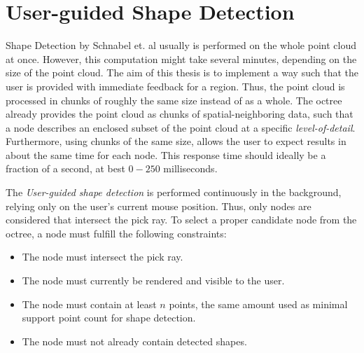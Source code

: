 \section{User-guided Shape Detection}
\label{sec:user_guided_sd}

Shape Detection by Schnabel et. al\cite{schnabel-2007-efficient} usually is performed on the whole point cloud at once. However, this computation might take several minutes, depending on the size of the point cloud. The aim of this thesis is to implement a way such that the user is provided with immediate feedback for a region. Thus, the point cloud is processed in chunks of roughly the same size instead of as a whole. The octree already provides the point cloud as chunks of spatial-neighboring data, such that a node describes an enclosed subset of the point cloud at a specific \textit{level-of-detail}. Furthermore, using chunks of the same size, allows the user to expect results in about the same time for each node. This response time should ideally be a fraction of a second, at best $0-250$ milliseconds. 

The \textit{User-guided shape detection} is performed continuously in the background, relying only on the user's current mouse position. Thus, only nodes are considered that intersect the pick ray. To select a proper candidate node from the octree, a node must fulfill the following constraints: 
\begin{itemize}
	\item The node must intersect the pick ray.
	\item The node must currently be rendered and visible to the user. 
	\item The node must contain at least $n$ points, the same amount used as minimal support point count for shape detection.
	\item The node must not already contain detected shapes.
\end{itemize}

